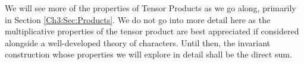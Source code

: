 We will see more of the properties of Tensor Products as we go along, primarily in Section \ref{Ch3:Sec:Products}. We do not go into more detail here as the multiplicative properties of the tensor product are best appreciated if considered alongside a well-developed theory of characters. Until then, the invariant construction whose properties we will explore in detail shall be the direct sum.